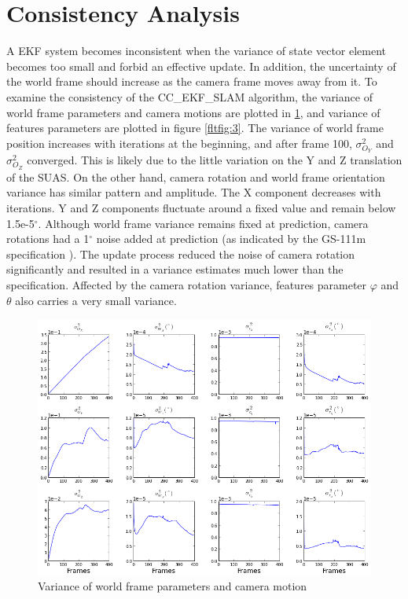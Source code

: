 \section{Consistency Analysis}\label{sec:flight-consistency}
A EKF system becomes inconsistent when the variance of state vector
element becomes too small and forbid an effective update. In addition,
the uncertainty of the world frame should increase as the camera frame
moves away from it. To examine the consistency of the CC\_EKF\_SLAM
algorithm, the variance of world frame parameters and camera motions
are plotted in \ref{fltfig:120}, and variance of features parameters
are plotted in figure \ref{fltfig:3}. The variance of world frame
position increases with iterations at the beginning, and after frame
100, $\sigma^2_{O_Y}$ and $\sigma^2_{O_Z}$ converged. This is
likely due to the little variation on the Y and Z translation of the
SUAS. On the other hand, camera rotation and world frame orientation
variance has similar pattern and amplitude. The X component decreases
with iterations. Y and Z components fluctuate around a fixed value and
remain below 1.5e-5$^\circ$. Although world frame variance remains fixed
at prediction, camera rotations had a 1$^\circ$ noise added at
prediction (as indicated by the GS-111m specification
\cite{_athena_????}). The update process reduced the noise of camera
rotation significantly and resulted in a variance estimates much lower
than the specification. Affected by the camera rotation variance,
features parameter $\varphi$ and $\theta$ also carries a very small
variance.


\begin{figure}[h]
\centering
\includegraphics[width=14cm, keepaspectratio=true]
{./Figures/fltfig/cut1/Figure120.png}
\caption{Variance of world frame parameters and camera motion}
\label{fltfig:120}
\end{figure}


